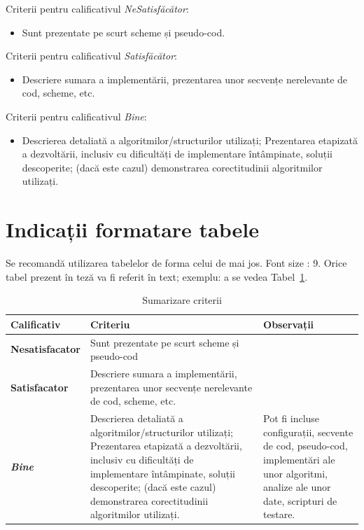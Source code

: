 \documentclass[12pt,a4paper]{report}
\begin{document}
Criterii pentru calificativul \textit{Ne\textit{Satisfăcător}}: 
\begin{itemize}
	\item	Sunt prezentate pe scurt scheme și pseudo-cod.
\end{itemize}
Criterii pentru calificativul \textit{Satisfăcător}: 
\begin{itemize}
	\item	Descriere sumara a implementării, prezentarea unor secvențe nerelevante de cod, scheme, etc. 
\end{itemize}
Criterii pentru calificativul \textit{Bine}: 
\begin{itemize}
	\item	Descrierea detaliată a algoritmilor/structurilor utilizați; Prezentarea etapizată a dezvoltării, inclusiv cu dificultăți de implementare întâmpinate, soluții descoperite; (dacă este cazul) demonstrarea corectitudinii algoritmilor utilizați. 
\end{itemize}

\section{Indicații formatare tabele}
Se recomandă utilizarea tabelelor de forma celui de mai jos.  Font size :  9. 
Orice tabel prezent în teză va fi referit în text; exemplu: a se vedea Tabel~\ref{tab:criterii}.

\begin{table}[th]\small\linespread{1}
\caption{Sumarizare criterii}
\label{tab:criterii}
\begin{tabular}{l >{\raggedright\arraybackslash}p{8cm} >{\raggedright\arraybackslash}p{4cm}}
\textbf{Calificativ} & \textbf{Criteriu} & \textbf{Observații} \\\hline
\textbf{Nesatisfacator} & Sunt prezentate pe scurt scheme și pseudo-cod & \\\hline
\textbf{Satisfacator} &Descriere sumara a implementării, prezentarea unor secvențe nerelevante de cod, scheme, etc.& \\
\hline
\textbf{\textit{Bine}} &Descrierea detaliată a algoritmilor/structurilor utilizați; Prezentarea etapizată a dezvoltării, inclusiv cu dificultăți de implementare întâmpinate, soluții descoperite; (dacă este cazul) demonstrarea corectitudinii algoritmilor utilizați. & Pot fi incluse configurații, secvente de cod, pseudo-cod, implementări ale unor algoritmi, analize ale unor date, scripturi de testare. \\
\hline
\end{tabular}
\end{table}
\end{document}
